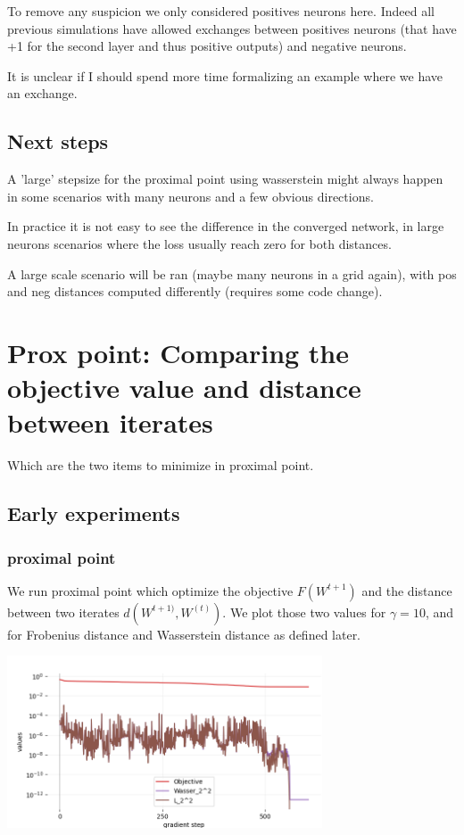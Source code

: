 To remove any suspicion we only considered positives neurons here. Indeed all previous simulations have allowed exchanges between positives neurons (that have +1 for the second layer and thus positive outputs) and negative neurons.

It is unclear if I should spend more time formalizing an example where we have an exchange.

\subsection{Next steps}

A 'large' stepsize for the proximal point using wasserstein might always happen in some scenarios with many neurons and a few obvious directions.

In practice it is not easy to see the difference in the converged network, in large neurons scenarios where the loss usually reach zero for both distances.

A large scale scenario will be ran (maybe many neurons in a grid again), with pos and neg distances computed differently (requires some code change).

\section{Prox point: Comparing the objective value and distance between iterates}
Which are the two items to minimize in proximal point.
\subsection{Early experiments}
\subsubsection{proximal point}

We run proximal point which optimize the objective $F(W^{t+1})$ and the distance between two iterates $d(W^{t+1)}, W^{(t)})$. We plot those two values for $\gamma=10$, and for Frobenius distance and Wasserstein distance as defined later.

\includegraphics[width=0.7\textwidth]{imgs/tau10_graph_full.png}

